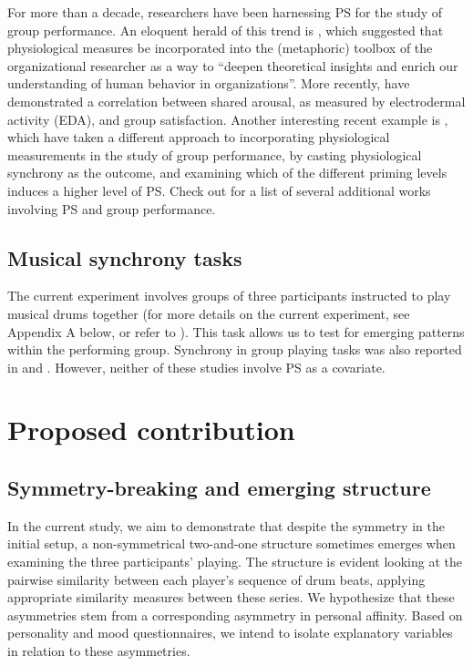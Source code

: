 \documentclass[a4paper, 11pt]{report}      %
\begin{document}
For more than a decade, researchers have been harnessing PS for the study of group performance. An eloquent herald of this trend is \citet{akinola2010measuring}, which suggested that physiological measures be incorporated into the (metaphoric) toolbox of the organizational researcher as a way to \enquote{deepen theoretical insights and enrich our understanding of human behavior in organizations}. More recently,  \citet{chikersal2017deep} have demonstrated a correlation between shared arousal, as measured by electrodermal activity (EDA), and group satisfaction. Another interesting recent example is \citet{danyluck2018intergroup}, which have taken a different approach to incorporating physiological measurements in the study of group performance, by casting physiological synchrony as the outcome, and examining which of the different priming levels induces a higher level of PS. Check out \citet{jar202physiological} for a list of several additional works involving PS and group performance.

\subsection{Musical synchrony tasks}
The current experiment involves groups of three participants instructed to play musical drums together (for more details on the current experiment, see Appendix A below, or refer to \cite{gordon2020physio}). This task allows us to test for emerging patterns within the performing group. Synchrony in group playing tasks was also reported in  \cite{abp2017symmetry} and \cite{shahal2020synchronization}. However, neither of these studies involve PS as a covariate.

\section{Proposed contribution}
\subsection{Symmetry-breaking and emerging structure}
In the current study, we aim to demonstrate that despite the symmetry in the initial setup, a non-symmetrical two-and-one structure sometimes emerges when examining the three participants' playing. The structure is evident looking at the pairwise similarity between each player's sequence of drum beats, applying appropriate similarity measures between these series. We hypothesize that these asymmetries stem from a corresponding asymmetry in personal affinity. Based on personality and mood questionnaires, we intend to isolate explanatory variables in relation to these asymmetries.
\end{document}
